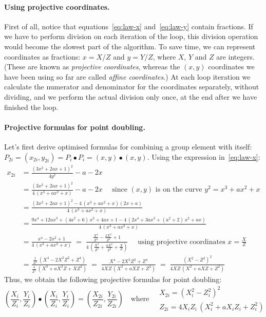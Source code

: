 \documentclass{article}
\begin{document}
\paragraph{Using projective coordinates.}

First of all, notice that equations~\eqref{eq:law-x} and~\eqref{eq:law-y} contain fractions.
If we have to perform division on each iteration of the loop, this division operation would become the slowest part of the algorithm.
To save time, we can represent coordinates as fractions: $x = X/Z$ and $y = Y/Z$, where $X$, $Y$ and $Z$ are integers.
(These are known as \emph{projective coordinates}, whereas the $(x, y)$ coordinates we have been using so far are called \emph{affine coordinates}.)
At each loop iteration we calculate the numerator and denominator for the coordinates separately, without dividing, and we perform the actual division only once, at the end after we have finished the loop.

\paragraph{Projective formulas for point doubling.}

Let's first derive optimised formulas for combining a group element with itself:
$P_{2i} = (x_{2i}, y_{2i}) = P_i \bullet P_i = (x, y) \bullet (x, y)$.
Using the expression in~\eqref{eq:law-x}:
\begin{align}
x_{2i} &= \frac{(3x^2 + 2ax + 1)^2}{4y^2} - a - 2x \nonumber\\[5pt]
&= \frac{(3x^2 + 2ax + 1)^2}{4\,(x^3 + ax^2 + x)} - a - 2x 
    \quad\text{ since } (x, y) \text { is on the curve } y^2 = x^3 + ax^2 + x \nonumber\\[5pt]
&= \frac{(3x^2 + 2ax + 1)^2 - 4\,(x^3 + ax^2 + x)(2x + a)}{4\,(x^3 + ax^2 + x)} \nonumber\\[5pt]
&= \frac{9x^4 + 12ax^3 + (4a^2 + 6)\,x^2 + 4ax + 1 -4\,(2x^4 + 3ax^3 + (a^2 + 2)\,x^2 + ax)}{4\,(x^3 + ax^2 + x)} \nonumber\\[5pt]
&= \frac{x^4 -2x^2 + 1}{4\,(x^3 + ax^2 + x)} 
    \;=\; \frac{\frac{X^4}{Z^4} - \frac{2X^2}{Z^2} + 1}{4\,\left(\frac{X^3}{Z^3} + \frac{aX^2}{Z^2} + \frac{X}{Z}\right)}
    \quad\text{ using projective coordinates } x=\frac{X}{Z} \label{eq:alt-doubling}\\[5pt]
&= \frac{\frac{1}{Z^4}\,(X^4 - 2X^2 Z^2 + Z^4)}{\frac{4}{Z^3}\,(X^3 + aX^2 Z + X Z^2)}
    \;=\; \frac{X^4 - 2X^2 Z^2 + Z^4}{4XZ\,(X^2 + aX Z + Z^2)}
    \;=\; \frac{(X^2 - Z^2)^2}{4XZ\,(X^2 + aX Z + Z^2)} \nonumber
\end{align}
Thus, we obtain the following projective formulas for point doubling:
\begin{equation}
\left(\frac{X_i}{Z_i}, \frac{Y_i}{Z_i}\right) \bullet \left(\frac{X_i}{Z_i}, \frac{Y_i}{Z_i}\right) =
\left(\frac{X_{2i}}{Z_{2i}}, \frac{Y_{2i}}{Z_{2i}}\right) \quad\text{where}\quad
\begin{array}{l}
    X_{2i} = (X_i^2 - Z_i^2)^2 \\[5pt]
    Z_{2i} = 4X_i Z_i\,(X_i^2 + aX_i Z_i + Z_i^2)
\end{array}\label{eq:projective-double}
\end{equation}
\end{document}

